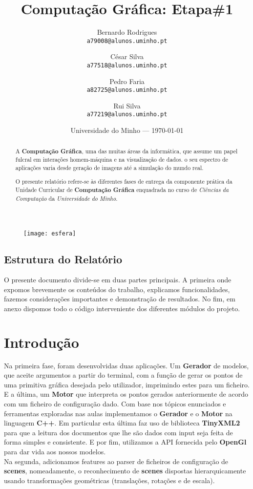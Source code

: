 \documentclass{article}
\title{Computação Gráfica: Etapa\#1} %
\author{Bernardo Rodrigues\\ \texttt{a79008@alunos.uminho.pt}\\ \and César Silva\\ \texttt{a77518@alunos.uminho.pt}\\ \and Pedro Faria\\ \texttt{a82725@alunos.uminho.pt} \and Rui Silva\\ \texttt{a77219@alunos.uminho.pt}\\} %
\date{Universidade do Minho --- \today} %
\begin{document}
\maketitle 
\begin{figure}[H]
	\centering
	\texttt{[image: esfera]}
\end{figure}
\newpage

\begin{abstract}
A \textbf{Computação Gráfica}, uma das muitas áreas da informática, que assume um papel fulcral em interações homem-máquina e na visualização de dados. o seu espectro de aplicações varia desde geração de imagens até a simulação do mundo real. \par
	O presente relatório refere-se às diferentes fases de entrega da componente prática da Unidade Curricular de \textbf{Computação Gráfica} enquadrada no curso de \textit{Ciências da Computação} da \textit{Universidade do Minho}. 
\end{abstract}
\newpage


\tableofcontents{}
\newpage



\subsection{Estrutura do Relatório}
O presente documento divide-se em duas partes principais. A primeira onde expomos brevemente os conteúdos do trabalho, explicamos funcionalidades, fazemos considerações importantes e demonstração de resultados.
No fim, em anexo dispomos  todo o código interveniente dos diferentes módulos do projeto. 
\newpage

\section{Introdução}
Na primeira fase, foram desenvolvidas duas aplicações. Um \textbf{Gerador} de modelos, que aceite argumentos a partir do terminal, com a função de gerar os pontos de uma primitiva gráfica desejada pelo utilizador, imprimindo estes para um ficheiro. E a última, um \textbf{Motor} que interpreta os pontos gerados anteriormente de acordo com um ficheiro de configuração dado. 
Com base nos tópicos enunciados e ferramentas exploradas nas aulas implementamos o \textbf{Gerador} e o \textbf{Motor} na linguagem \textbf{C++}. Em particular esta última faz uso de biblioteca \textbf{TinyXML2} para que a leitura dos documentos que lhe são dados com input seja feita de forma simples e consistente. E por fim,  utilizamos a API fornecida pelo \textbf{OpenGl} para dar vida aos nossos modelos.\\
Na segunda, adicionamos features ao parser de ficheiros de configuração de \textbf{scenes}, nomeadamente, o reconhecimento de \textbf{scenes} dispostas hierarquicamente usando transformações geométricas (translações, rotações e de escala).
\newpage
\end{document}
